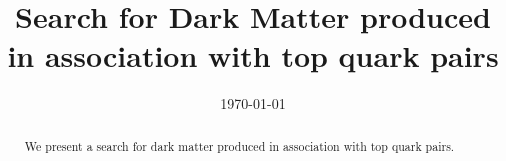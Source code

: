 \documentclass{cmspaper}
\begin{document}
\begin{titlepage}


  \date{\today}

  \title{Search for Dark Matter produced in association with top quark pairs}

  

  \begin{abstract}
    We present a search for dark matter produced in association with top quark pairs.
  \end{abstract} 

\end{titlepage}

\tableofcontents
\newpage 
\linenumbers


 

\clearpage


\clearpage




\clearpage


\clearpage


\clearpage


\clearpage


\clearpage
\appendix

\clearpage

\clearpage

\clearpage

\clearpage

\clearpage
\end{document}
